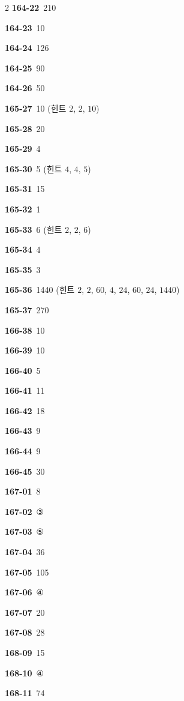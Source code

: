 \documentclass[10pt,a4paper]{article}
\begin{document}
\begin{multicols}{2}
\noindent\textbf{164-22}\ 210\par
\noindent\textbf{164-23}\ 10\par
\noindent\textbf{164-24}\ 126\par
\noindent\textbf{164-25}\ 90\par
\noindent\textbf{164-26}\ 50\par
\noindent\textbf{165-27}\ 10 (힌트 $2$, $2$, $10$)\par
\noindent\textbf{165-28}\ 20\par
\noindent\textbf{165-29}\ 4\par
\noindent\textbf{165-30}\ 5 (힌트 $4$, $4$, $5$)\par
\noindent\textbf{165-31}\ 15\par
\noindent\textbf{165-32}\ 1\par
\noindent\textbf{165-33}\ 6 (힌트 $2$, $2$, $6$)\par
\noindent\textbf{165-34}\ 4\par
\noindent\textbf{165-35}\ 3\par
\noindent\textbf{165-36}\ 1440 (힌트 $2$, $2$, $60$, $4$, $24$, $60$, $24$, $1440$)\par
\noindent\textbf{165-37}\ 270\par
\noindent\textbf{166-38}\ 10\par
\noindent\textbf{166-39}\ 10\par
\noindent\textbf{166-40}\ 5\par
\noindent\textbf{166-41}\ 11\par
\noindent\textbf{166-42}\ 18\par
\noindent\textbf{166-43}\ 9\par
\noindent\textbf{166-44}\ 9\par
\noindent\textbf{166-45}\ 30\par
\noindent\textbf{167-01}\ 8\par
\noindent\textbf{167-02}\ ③\par
\noindent\textbf{167-03}\ ⑤\par
\noindent\textbf{167-04}\ 36\par
\noindent\textbf{167-05}\ 105\par
\noindent\textbf{167-06}\ ④\par
\noindent\textbf{167-07}\ 20\par
\noindent\textbf{167-08}\ 28\par
\noindent\textbf{168-09}\ 15\par
\noindent\textbf{168-10}\ ④\par
\noindent\textbf{168-11}\ 74\par

\end{multicols}
\end{document}
